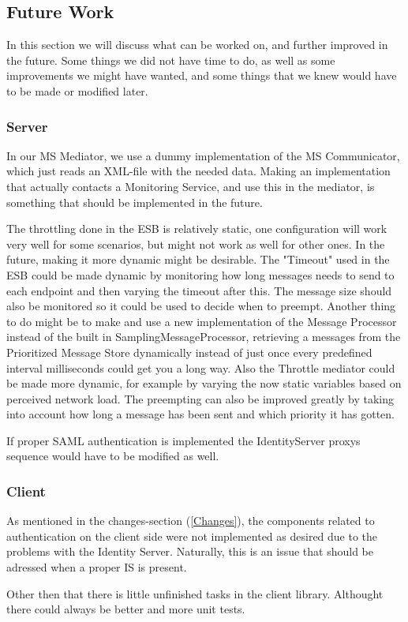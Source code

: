 \subsection{Future Work}\label{Future Work}
    In this section we will discuss what can be worked on, and further improved in the future. Some things we did not have time to do, as well as some improvements we might have wanted, and some things that we knew would have to be made or modified later.

    \subsubsection{Server}\label{Future:Server}
        In our MS Mediator, we use a dummy implementation of the MS Communicator, which just reads an XML-file with the needed data. Making an implementation that actually contacts a Monitoring Service, and use this in the mediator, is something that should be implemented in the future.

        The throttling done in the ESB is relatively static, one configuration will work very well for some scenarios, but might not work as well for other ones. In the future, making it more dynamic might be desirable. The "Timeout" used in the ESB could be made dynamic by monitoring how long messages needs to send to each endpoint and then varying the timeout after this. The message size should also be monitored so it could be used to decide when to preempt. Another thing to do might be to make and use a new implementation of the Message Processor instead of the built in SamplingMessageProcessor, retrieving a messages from the Prioritized Message Store dynamically instead of just once every predefined interval milliseconds could get you a long way. Also the Throttle mediator could be made more dynamic, for example by varying the now static variables based on perceived network load. The preempting can also be improved greatly by taking into account how long a message has been sent and which priority it has gotten.

        If proper SAML authentication is implemented the IdentityServer proxys sequence would have to be modified as well.

	\subsubsection{Client}\label{Future:Client}
		As mentioned in the changes-section (\ref{Changes}), the components related to authentication on the client side were not implemented as desired due to the problems with the Identity Server. Naturally, this is an issue that should be adressed when a proper IS is present.
		
    	Other then that there is little unfinished tasks in the client library. Althought there could always be better and more unit tests. 

